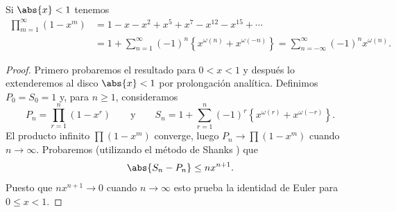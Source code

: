 \documentclass[12pt,a4paper]{book}
\begin{document}
    \begin{teorema}\label{teo:14-3}
        Si $\abs{x}<1$ tenemos
        \begin{align*}
            \prod_{m=1}^{\infty}(1-x^{m})&=1-x-x^{2}+x^{5}+x^{7}-x^{12}-x^{15}+\cdots\\
            &=1+\sum_{n=1}^{\infty}(-1)^{n}\left\{x^{\omega(n)}+x^{\omega(-n)}\right\}=\sum_{n=-\infty}^{\infty}(-1)^{n}x^{\omega(n)}.
        \end{align*}
    \end{teorema}

    \begin{proof}
        Primero probaremos el resultado para $0<x<1$ y después lo extenderemos al disco
        $\abs{x}<1$ por prolongación analítica. Definimos $P_{0}=S_{0}=1$ y, para $n\geq1$,
        consideramos
        \begin{equation*}
            P_{n}=\prod_{r=1}^{n}(1-x^{r})\qquad\text{y}\qquad S_{n}=1+\sum_{r=1}^{n}(-1)^{r}\left\{x^{\omega(r)}+x^{\omega(-r)}\right\}.
        \end{equation*}
        El producto infinito $\prod(1-x^{m})$ converge, luego $P_{n}\to\prod(1-x^{m})$ cuando
        $n\to\infty$. Probaremos (utilizando el método de Shanks \cite{shanks1951}) que
        \begin{equation}\label{eq:14-6}
            \abs{S_{n}-P_{n}}\leq nx^{n+1}.
        \end{equation}
        Puesto que $nx^{n+1}\to0$ cuando $n\to\infty$ esto prueba la identidad de Euler para
        $0\leq x<1$.


\end{proof}
\end{document}
